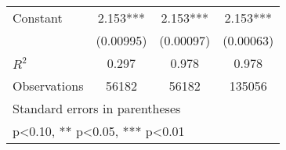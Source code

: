 \begin{table}[htbp]
\begin{tabular}{l*{3}{c}}
\addlinespace
Constant            &       2.153***&       2.153***&       2.153***\\
                    &   (0.00995)   &   (0.00097)   &   (0.00063)   \\
\midrule
\(R^{2}\)           &       0.297   &       0.978   &       0.978   \\
Observations        &       56182   &       56182   &      135056   \\
\bottomrule
\multicolumn{4}{l}{\footnotesize Standard errors in parentheses}\\
\multicolumn{4}{l}{\footnotesize * p<0.10, ** p<0.05, *** p<0.01}\\
\end{tabular}
\end{table}
